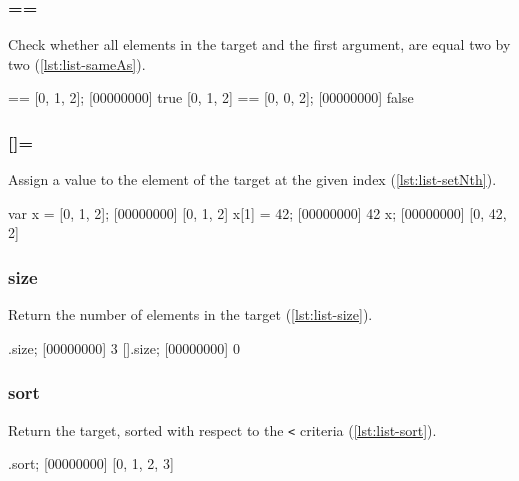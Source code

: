 \subsubsection{==}

Check whether all elements in the target and the first argument, are
equal two by two (\autoref{lst:list-sameAs}).

\begin{urbiscript}[caption={List}, label=lst:list-sameAs]
[0, 1, 2] == [0, 1, 2];
[00000000] true
[0, 1, 2] == [0, 0, 2];
[00000000] false
\end{urbiscript}

\subsubsection{[]=}
\label{sec:std-list-setnth}

Assign a value to the element of the target at the given index
(\autoref{lst:list-setNth}).

\begin{urbiscript}[caption={List}, label=lst:list-setNth]
var x = [0, 1, 2];
[00000000] [0, 1, 2]
x[1] = 42;
[00000000] 42
x;
[00000000] [0, 42, 2]
\end{urbiscript}

\subsubsection{size}

Return the number of elements in the target (\autoref{lst:list-size}).

\begin{urbiscript}[caption=List.size, label=lst:list-size]
[1, 2, 3].size;
[00000000] 3
[].size;
[00000000] 0
\end{urbiscript}

\subsubsection{sort}

Return the target, sorted with respect to the \lstinline|<| criteria
(\autoref{lst:list-sort}).

\begin{urbiscript}[caption=List.sort, label=lst:list-sort]
[1, 0, 3, 2].sort;
[00000000] [0, 1, 2, 3]
\end{urbiscript}

